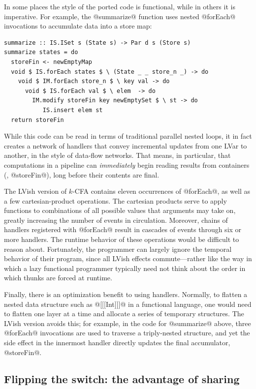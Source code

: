 In some places the style of the ported code is functional, while in
others it is imperative.  For example, the @summarize@ function uses
nested @forEach@ invocations to accumulate data into a store map:

\singlespacing
\begin{lstlisting}
summarize :: IS.ISet s (State s) -> Par d s (Store s)
summarize states = do
  storeFin <- newEmptyMap
  void $ IS.forEach states $ \ (State _ _ store_n _) -> do 
    void $ IM.forEach store_n $ \ key val -> do
      void $ IS.forEach val $ \ elem  -> do
        IM.modify storeFin key newEmptySet $ \ st -> do
           IS.insert elem st
  return storeFin
\end{lstlisting}
\doublespacing

While this code can be read in terms of traditional parallel nested
loops, it in fact creates a network of handlers that convey
incremental updates from one LVar to another, in the style of
data-flow networks.  That means, in particular, that computations in a
pipeline can \emph{immediately} begin reading results from containers
(\eg, @storeFin@), long before their contents are final.

The LVish version of $k$-CFA contains eleven occurrences of @forEach@,
as well as a few cartesian-product operations.  The cartesian products
serve to apply functions to combinations of all possible values that
arguments may take on, greatly increasing the number of events
in circulation.  Moreover, chains of handlers registered with
@forEach@ result in cascades of events through six or more handlers.
The runtime behavior of these operations would be difficult to reason
about.  Fortunately, the programmer can largely ignore the temporal
behavior of their program, since all LVish effects commute---rather
like the way in which a lazy functional programmer typically need not
think about the order in which thunks are forced at runtime.

Finally, there is an optimization benefit to using handlers.
Normally, to flatten a nested data structure such as @[[[Int]]]@ in a
functional language, one would need to flatten one layer at a time and
allocate a series of temporary structures.  The LVish version avoids
this; for example, in the code for @summarize@ above, three @forEach@
invocations are used to traverse a triply-nested structure, and yet
the side effect in the innermost handler directly updates the final
accumulator, @storeFin@.

\subsection{Flipping the switch: the advantage of sharing}

